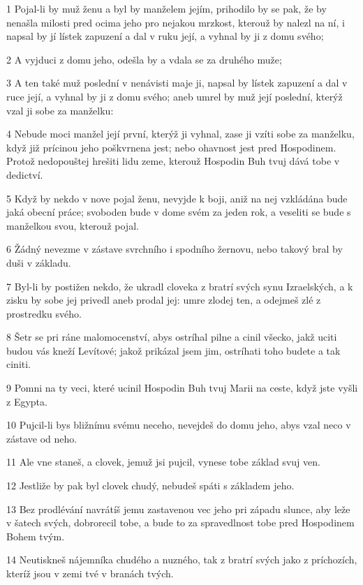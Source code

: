\par 1 Pojal-li by muž ženu a byl by manželem jejím, prihodilo by se pak, že by nenašla milosti pred ocima jeho pro nejakou mrzkost, kterouž by nalezl na ní, i napsal by jí lístek zapuzení a dal v ruku její, a vyhnal by ji z domu svého;
\par 2 A vyjduci z domu jeho, odešla by a vdala se za druhého muže;
\par 3 A ten také muž poslední v nenávisti maje ji, napsal by lístek zapuzení a dal v ruce její, a vyhnal by ji z domu svého; aneb umrel by muž její poslední, kterýž vzal ji sobe za manželku:
\par 4 Nebude moci manžel její první, kterýž ji vyhnal, zase ji vzíti sobe za manželku, když již prícinou jeho poškvrnena jest; nebo ohavnost jest pred Hospodinem. Protož nedopouštej hrešiti lidu zeme, kterouž Hospodin Buh tvuj dává tobe v dedictví.
\par 5 Když by nekdo v nove pojal ženu, nevyjde k boji, aniž na nej vzkládána bude jaká obecní práce; svoboden bude v dome svém za jeden rok, a veseliti se bude s manželkou svou, kterouž pojal.
\par 6 Žádný nevezme v zástave svrchního i spodního žernovu, nebo takový bral by duši v základu.
\par 7 Byl-li by postižen nekdo, že ukradl cloveka z bratrí svých synu Izraelských, a k zisku by sobe jej privedl aneb prodal jej: umre zlodej ten, a odejmeš zlé z prostredku svého.
\par 8 Šetr se pri ráne malomocenství, abys ostríhal pilne a cinil všecko, jakž uciti budou vás kneží Levítové; jakož prikázal jsem jim, ostríhati toho budete a tak ciniti.
\par 9 Pomni na ty veci, které ucinil Hospodin Buh tvuj Marii na ceste, když jste vyšli z Egypta.
\par 10 Pujcil-li bys bližnímu svému neceho, nevejdeš do domu jeho, abys vzal neco v zástave od neho.
\par 11 Ale vne staneš, a clovek, jemuž jsi pujcil, vynese tobe základ svuj ven.
\par 12 Jestliže by pak byl clovek chudý, nebudeš spáti s základem jeho.
\par 13 Bez prodlévání navrátíš jemu zastavenou vec jeho pri západu slunce, aby leže v šatech svých, dobrorecil tobe, a bude to za spravedlnost tobe pred Hospodinem Bohem tvým.
\par 14 Neutiskneš nájemníka chudého a nuzného, tak z bratrí svých jako z príchozích, kteríž jsou v zemi tvé v branách tvých.
